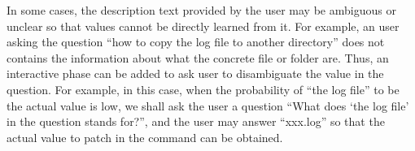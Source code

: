 In some cases, the description text provided by the user may be ambiguous or unclear so that values cannot be directly learned from it. For example, an user asking the question ``how to copy the log file to another directory'' does not contains the information about what the concrete file or folder are. Thus, an interactive phase can be added to ask user to disambiguate the value in the question. For example, in this case, when the probability of ``the log file'' to be the actual value is low, we shall ask the user a question ``What does `the log file' in the question stands for?'', and the user may answer ``xxx.log'' so that the actual value to patch in the command can be obtained.
